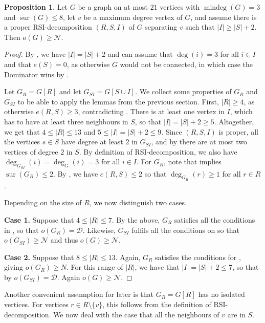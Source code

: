 \documentclass[a4paper,11pt,oneside]{scrartcl}
\theoremstyle{definition}
\newtheorem{proposition}[definition]{Proposition}
\theoremstyle{remark}
\DeclareMathOperator{\mindeg}{mindeg}
\DeclareMathOperator{\sur}{sur}
\begin{document}
\begin{proposition}\label{proposition:i=s+2}
    Let $G$ be a graph on at most $21$ vertices with $\mindeg(G) = 3$ and $\sur(G) \leq 8$, let $v$ be a maximum degree vertex of $G$, and assume there is a proper RSI-decomposition $(R,S,I)$ of $G$ separating $v$ such that $|I| \geq |S|+2$. Then $o(G) \geq \mathcal N$.  
\end{proposition}
\begin{proof}
    By , we have $|I| = |S|+2$ and can assume that $\deg(i) = 3$ for all $i \in I$ and that $e(S) = 0$, as otherwise $G$ would not be connected, in which case the Dominator wins by .
    
    Let $G_R = G[R]$ and let $G_{SI} = G[S \cup I]$. We collect some properties of $G_R$ and $G_{SI}$ to be able to apply the lemmas from the previous section. First, $|R| \geq 4$, as otherwise $e(R,S) \geq 3$, contradicting . There is at least one vertex in $I$, which has to have at least three neighbours in $S$, so that $|I|= |S|+2 \geq 5$. Altogether, we get that $4 \leq |R| \leq 13$ and $5 \leq |I|= |S|+2 \leq 9$. Since $(R,S,I)$ is proper, all the vertices $s \in S$ have degree at least $2$ in $G_{SI}$, and by  there are at most two vertices of degree $2$ in $S$. By definition of RSI-decomposition, we also have $\deg_{G_{SI}}(i) = \deg_G(i) = 3$ for all $i\in I$. For $G_R$, note that  implies $\sur(G_R) \le 2$. By , we have $e(R,S) \leq 2$ so that $\deg_{G_R}(r) \geq 1$ for all $r \in R$.
    
    Depending on the size of $R$, we now distinguish two cases. 

    \textbf{Case 1. } Suppose that $4 \leq |R| \leq 7$. By the above, $G_R$ satisfies all the conditions in , so that $o(G_R) = \mathcal D$. Likewise, $G_{SI}$ fulfils all the conditions on  so that $o(G_{SI}) \geq \mathcal N$ and thus $o(G) \geq \mathcal N$.

    \textbf{Case 2. } Suppose that $8 \leq |R| \leq 13$. Again, $G_R$ satisfies the conditions for , giving $o(G_R) \geq N$. For this range of $|R|$, we have that $|I| = |S|+2 \leq 7$, so that by  $o(G_{SI}) = \mathcal D$. Again $o(G) \geq \mathcal N$. 
\end{proof}

Another convenient assumption for later is that $G_R = G[R]$ has no isolated vertices. For vertices $r\in R\setminus\{v\}$, this follows from the definition of RSI-decomposition. We now deal with the case that all the neighbours of $v$ are in $S$.
\end{document}

